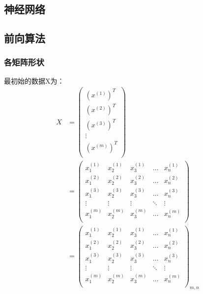 \subsection{神经网络}
	

\subsection{前向算法}
\subsubsection{各矩阵形状}

最初始的数据X为：
\begin{equation} \begin{aligned}
	X & = \left(\begin{matrix}
			(x^{(1)})^T \\ (x^{(2)})^T \\ (x^{(3)})^T \\ \vdots \\ (x^{(m)})^T \\
		\end{matrix}\right) \\
	& = \left( \begin{matrix}
			x_1^{(1)} & x_2^{(1)} & x_3^{(1)} & \dots & x_n^{(1)} \\
			x_1^{(2)} & x_2^{(2)} & x_3^{(2)} & \dots & x_n^{(2)} \\
			x_1^{(3)} & x_2^{(3)} & x_3^{(3)} & \dots & x_n^{(3)} \\
			\vdots    & \vdots    & \vdots    & \ddots & \vdots   \\
			x_1^{(m)} & x_2^{(m)} & x_3^{(m)} & \dots & x_n^{(m)} \\
			\end{matrix}\right) \\
	& = \left(\begin{matrix}
			x_1^{(1)} & x_2^{(1)} & x_3^{(1)} & \dots & x_n^{(1)} \\
			x_1^{(2)} & x_2^{(2)} & x_3^{(2)} & \dots & x_n^{(2)} \\
			x_1^{(3)} & x_2^{(3)} & x_3^{(3)} & \dots & x_n^{(3)} \\
			\vdots    & \vdots    & \vdots    & \ddots & \vdots   \\
			x_1^{(m)} & x_2^{(m)} & x_3^{(m)} & \dots & x_n^{(m)} \\
		\end{matrix}\right)_{m,n}
\end{aligned} \end{equation}

